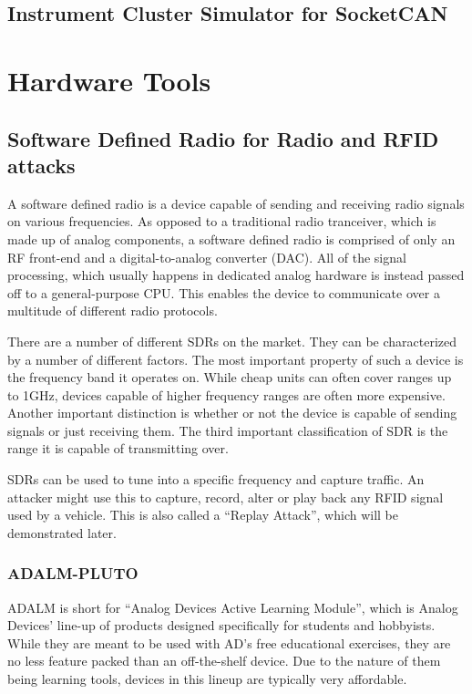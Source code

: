 \subsection{Instrument Cluster Simulator for SocketCAN}


\section{Hardware Tools}
\subsection{Software Defined Radio for Radio and RFID attacks}
A software defined radio is a device capable of sending and receiving radio signals on various frequencies. As opposed to a traditional radio tranceiver, which is made up of analog components, a software defined radio is comprised of only an RF front-end and a digital-to-analog converter (DAC). All of the signal processing, which usually happens in dedicated analog hardware is instead passed off to a general-purpose CPU. This enables the device to communicate over a multitude of different radio protocols.

There are a number of different SDRs on the market. They can be characterized by a number of different factors. The most important property of such a device is the frequency band it operates on. While cheap units can often cover ranges up to 1GHz, devices capable of higher frequency ranges are often more expensive. Another important distinction is whether or not the device is capable of sending signals or just receiving them. The third important classification of SDR is the range it is capable of transmitting over.

SDRs can be used to tune into a specific frequency and capture traffic. An attacker might use this to capture, record, alter or play back any RFID signal used by a vehicle. This is also called a ``Replay Attack'', which will be demonstrated later.

\subsubsection{ADALM-PLUTO}
ADALM is short for ``Analog Devices Active Learning Module'', which is Analog Devices' line-up of products designed specifically for students and hobbyists. While they are meant to be used with AD's free educational exercises, they are no less feature packed than an off-the-shelf device. Due to the nature of them being learning tools, devices in this lineup are typically very affordable.

